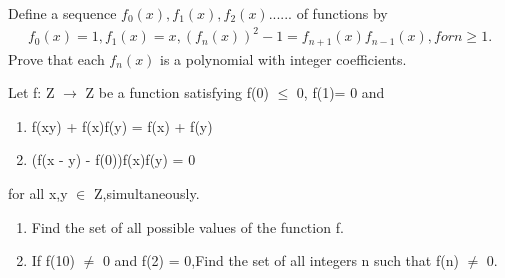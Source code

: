 \item Define a sequence $f_0(x), f_1(x), f_2(x)$...... of functions by
\begin{align*}
 f_0(x)=1, f_1(x)=x, (f_n(x))^{2} - 1 = f_{n+1}(x)f_{n-1}(x), for n \geq 1.
\end{align*}
Prove that each $f_n(x)$ is a polynomial with integer coefficients.

\item Let f: Z $\to$ Z be a function satisfying f(0) $\leq$ 0, f(1)= 0 and
\begin{enumerate}
\item f(xy) + f(x)f(y) = f(x) + f(y)
\item (f(x - y) - f(0))f(x)f(y) = 0
\end{enumerate} 
for all x,y $\in$ Z,simultaneously.
\begin{enumerate}
\item Find the set of all possible values of the function f.
\item If f(10) $\neq$ 0 and f(2) = 0,Find the set of all integers n such that f(n) $\neq$ 0.
\end{enumerate}





